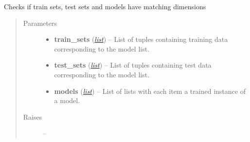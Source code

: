 \documentclass[letterpaper,10pt,english]{sphinxmanual}
\begin{document}
\begin{fulllineitems}
\label{classification:flamingo.classification.utils.check_sets}
Checks if train sets, test sets and models have matching dimensions
\begin{quote}\begin{description}
\item[{Parameters}] \leavevmode\begin{itemize}
\item {} 
\textbf{train\_sets} (\href{http://docs.python.org/library/functions.html\#list}{\emph{list}}) -- List of tuples containing training data corresponding to the model list.

\item {} 
\textbf{test\_sets} (\href{http://docs.python.org/library/functions.html\#list}{\emph{list}}) -- List of tuples containing test data corresponding to the model list.

\item {} 
\textbf{models} (\href{http://docs.python.org/library/functions.html\#list}{\emph{list}}) -- List of lists with each item a trained instance of a model.

\end{itemize}

\item[{Raises}] \leavevmode
{} --

\end{description}\end{quote}

\end{fulllineitems}

\end{document}
